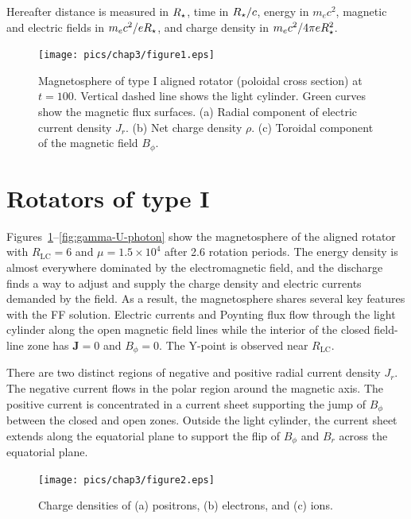 Hereafter distance is measured in $R_{\star}$, time in $R_{\star}/c$, energy in $m_ec^2$,
magnetic and electric fields in $m_ec^2/eR_{\star}$, and
charge density in $m_e c^2/4\pi eR_{\star}^2$.


\begin{figure}[t]
 \hspace*{-0.6cm}
    \texttt{[image: pics/chap3/figure1.eps]}
    \caption{\small
    Magnetosphere of type I aligned rotator (poloidal cross section) at $t = 100$.
    Vertical dashed line shows the light cylinder.
    Green curves show the magnetic flux surfaces.
    (a) Radial component of electric current density $J_r$.
           (b) Net charge density $\rho$.
           (c) Toroidal component of the magnetic field $B_\phi$.
 }
    \label{fig:j-rho-bphi}
\end{figure}

\section{Rotators of type I}


Figures~\ref{fig:j-rho-bphi}--\ref{fig:gamma-U-photon} show the magnetosphere of the
aligned rotator with $R_\mathrm{LC}=6$ and $\mu=1.5\times 10^4$ after 2.6 rotation periods.
The energy density is almost everywhere dominated by the electromagnetic
field, and the discharge finds a way to adjust and supply the charge density and
electric currents demanded by the field. As a result, the magnetosphere
shares several key features with the FF solution.
Electric currents and Poynting flux flow through the light cylinder along
the open magnetic field lines while the interior of the closed field-line zone
has $\mathbf{J}=0$ and $B_\phi=0$. The Y-point is observed near $R_\mathrm{LC}$.

There are two distinct regions of negative and positive radial current density $J_r$.
The negative current flows in the polar region around the magnetic axis.
The positive current is concentrated in a current sheet supporting
the jump of $B_\phi$ between the closed and open zones.
Outside the light cylinder, the current sheet extends along the equatorial plane
to support the flip of $B_\phi$ and $B_r$ across the equatorial plane.

\begin{figure}[t]
\hspace*{-0.6cm}
    \texttt{[image: pics/chap3/figure2.eps]}
    \caption{\small
Charge densities of (a) positrons, (b) electrons, and (c) ions.
}
    \label{fig:rho-pn-corotation}
\end{figure}


